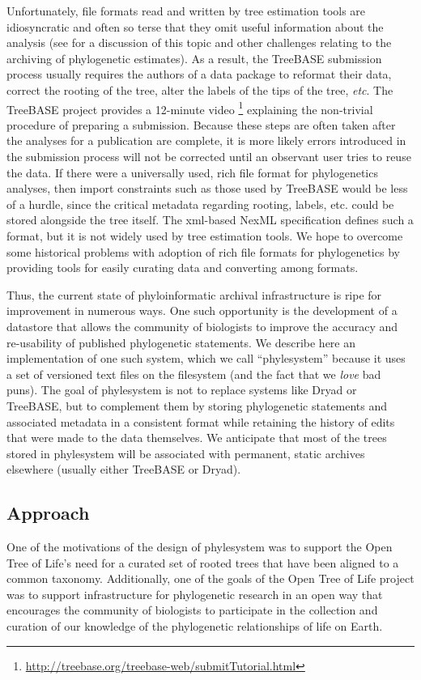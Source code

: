 \documentclass{bioinfo}
\newcommand{\ps}{phylesystem\xspace}
\newcommand{\otol}{Open Tree of Life\xspace}
\begin{document}
Unfortunately, file formats read and written by tree estimation tools are idiosyncratic and often so 
    terse that they omit useful information about the analysis (see \citet{StoltzfusEtAl2012} for a discussion
    of this topic and other challenges relating to the archiving of phylogenetic estimates).
As a result, the TreeBASE submission process usually requires the authors of a data package to reformat their data, correct
    the rooting of the tree, alter the labels of the tips of the tree, {\em etc}.
The TreeBASE project provides a 12-minute video 
    \footnote{\url{http://treebase.org/treebase-web/submitTutorial.html}} 
    explaining the non-trivial procedure of preparing a submission.
Because these steps are often taken after the analyses for a publication are complete, it is more likely 
    errors introduced in the submission process will not be corrected until an observant user tries to reuse the data.
If there were a universally used, rich file format for phylogenetics analyses, then import constraints such as those
    used by TreeBASE would be less of a hurdle, since the critical metadata regarding rooting, labels, etc. could be
    stored alongside the tree itself.
The xml-based NexML specification \citep{NeXML} defines such a format, but it is not widely used by tree estimation tools.
We hope to overcome some historical problems with adoption of rich file formats for phylogenetics 
   by providing tools for easily curating data and converting among formats.

Thus, the current state of phyloinformatic archival infrastructure is ripe for improvement in numerous ways.
One such opportunity is the development of a datastore that allows the community of biologists to improve the
    accuracy and re-usability of published phylogenetic statements.
We describe here an implementation of one such system, which we call ``phylesystem'' because it uses a set of
    versioned text files on the filesystem (and the fact that we {\em love} bad puns).
The goal of \ps is not to replace systems like Dryad or TreeBASE, but to complement them by 
    storing phylogenetic statements and associated metadata in a consistent format while retaining the history of
    edits that were made to the data themselves.
We anticipate that most of the trees stored in \ps will be associated with permanent, static archives
    elsewhere (usually either TreeBASE or Dryad).


\subsection{Approach}
One of the motivations of the design of \ps was to support the \otol's need for a curated set
    of rooted trees that have been aligned to a common taxonomy.
Additionally, one of the goals of the \otol project was to support infrastructure for phylogenetic
    research in an open way that encourages the community of biologists to participate in the 
    collection and curation of our knowledge of the phylogenetic relationships of life on Earth.
\end{document}
